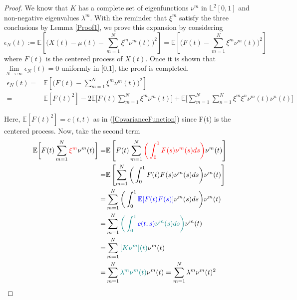 \documentclass[11pt,twoside,a4paper]{article}
\begin{document}
	\begin{proof}
		We know that $K$ has a complete set of eigenfunctions ${\nu^m}$ in $\mathbb{L}^{2}[0,1]$ and non-negative eigenvalues $\lambda^m$. With the reminder that $\xi^m$ satisfy the three conclusions by Lemma \ref{Proof1}, we prove this expansion by considering
		\begin{equation}
			\epsilon_{N}(t) := \mathbb{E} \left[\bigg( X(t) -\mu(t)- \sum_{m=1}^{N} \xi^m \nu^m(t)\bigg)^2 \right]
			= \mathbb{E} \left[\bigg( F(t) - \sum_{m=1}^{N} \xi^m \nu^m(t)\bigg)^2 \right]
		\end{equation}
		where $F(t)$ is the centered process of $X(t)$.
		Once it is shown that $\lim\limits_{N \rightarrow \infty} \epsilon_{N}(t) = 0$ uniformly in [0,1], the proof is completed.
		\begin{equation}\label{Thr1}
			\begin{split}
				\epsilon_{N}(t) = &\mathbb{E} \left[\bigg( F(t) - \sum_{m=1}^{N} \xi^m 	\nu^m(t)\bigg)^2 \right]\\
				= & \mathbb{E}[F(t)^{2}] - 2\mathbb{E}\bigg[F(t)\sum_{m=1}^{N}\xi^m\nu^m(t)\bigg] + \mathbb{E}\bigg[\sum_{m=1}^{N}\sum_{n=1}^{N}\xi^m\xi^n\nu^m(t)\nu^n(t)\bigg]
			\end{split}
		\end{equation}
		
		Here, $\mathbb{E}[F(t)^{2}] = c(t,t)$ as in (\ref{CovarianceFunction}) since F(t) is the centered process. Now, take the second term
		\begin{equation}\label{Thr2}
			\begin{split}
				\mathbb{E} \bigg[ F(t) \sum_{m=1}^{N} {\color{red}\xi^m}\nu^m(t) \bigg] = & \mathbb{E} \left[ F(t) \sum_{m=1}^{N} {\color{red}\bigg(\int_{0}^{1} F(s)\nu^m(s)ds\bigg)} \nu^m(t) \right]\\
				= & \mathbb{E} \left[ \sum_{m=1}^{N} \bigg(\int_{0}^{1} F(t)F(s)\nu^m(s)ds\bigg) \nu^m(t) \right]\\
				= & \sum_{m=1}^{N} \bigg(\int_{0}^{1} {\color{blue}\mathbb{E}[F(t)F(s)]}\nu^m(s)ds\bigg)\nu^m(t)\\
				= & \sum_{m=1}^{N} {\color{teal}\bigg(\int_{0}^{1} {\color{blue}c(t,s)} \nu^m(s)ds\bigg)}\nu^m(t)\\
				= & \sum_{m=1}^{N}{\color{teal}[K\nu^m](t)}\nu^m(t) \\
				= &\sum_{m=1}^{N}{\color{teal}\lambda^m\nu^m(t)}\nu^m(t) = \sum_{m=1}^{N}\lambda^m\nu^m(t)^{2}
			\end{split}
		\end{equation} 
		

\end{proof}
\end{document}
